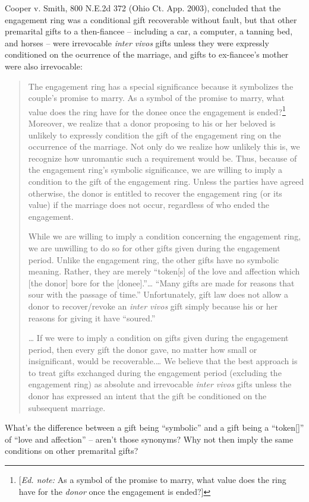 \item Cooper v. Smith, 800 N.E.2d 372 (Ohio Ct. App. 2003), concluded that the
engagement ring was a conditional gift recoverable without fault, but that
other premarital gifts to a then-fiancee -- including a car, a computer, a
tanning bed, and horses -- were irrevocable \textit{inter vivos} gifts unless
they were expressly conditioned on the ocurrence of the marriage, and gifts to
ex-fiancee's mother were also irrevocable: 
\begin{quotation}
The engagement ring has a special significance because it symbolizes the
couple's promise to marry. As a symbol of the promise to marry, what value does
the ring have for the donee once the engagement is ended?\footnote{
[\textit{Ed. note:} As a symbol of the promise to marry, what value does the
ring have for the \textit{donor} once the engagement is ended?]} Moreover, we
realize that a donor proposing to his or her beloved is unlikely to expressly
condition the gift of the engagement ring on the occurrence of the marriage.
Not only do we realize how unlikely this is, we recognize how unromantic such a
requirement would be. Thus, because of the engagement ring's symbolic
significance, we are willing to imply a condition to the gift of the engagement
ring. Unless the parties have agreed otherwise, the donor is entitled to
recover the engagement ring (or its value) if the marriage does not occur,
regardless of who ended the engagement.

While we are willing to imply a condition concerning the engagement ring, we are
unwilling to do so for other gifts given during the engagement period. Unlike
the engagement ring, the other gifts have no symbolic meaning. Rather, they are
merely ``token[s] of the love and affection which [the donor] bore for the
[donee].''\dots{} ``Many gifts are made for reasons that sour with the passage
of time.'' Unfortunately, gift law does not allow a donor to recover/revoke an
\textit{inter vivos} gift simply because his or her reasons for giving it have
``soured.''

\dots{} If we were to imply a condition on gifts given during the engagement
period, then every gift the donor gave, no matter how small or insignificant,
would be recoverable.\dots{} We believe that the best approach is to treat
gifts exchanged during the engagement period (excluding the engagement ring) as
absolute and irrevocable\textit{ inter vivos} gifts unless the donor has
expressed an intent that the gift be conditioned on the subsequent marriage.
\end{quotation}
What's the difference between a gift being ``symbolic'' and a gift being a
``token[]'' of ``love and affection'' -- aren't those synonyms?  Why not then
imply the same conditions on other premarital gifts?

